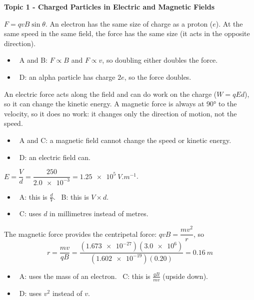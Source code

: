 \documentclass[12pt]{article}
\newcommand\anstopic[1]{\par\Needspace{8\baselineskip}\vspace{4mm}%
  \begin{center}{\headfont\bfseries\fontsize{14}{18}\selectfont #1\par}\end{center}\vspace{2pt}}
\begin{document}
\begin{practiceanswers}

\anstopic{Topic 1 - Charged Particles in Electric and Magnetic Fields}

\begin{practiceans}
  $F = qvB\sin\theta$. An electron has the same size of charge as a proton ($e$). At the same speed in
  the same field, the force has the same size (it acts in the opposite direction).
  \begin{itemize}
    \item \xmark\ A and B: $F \propto B$ and $F \propto v$, so doubling either doubles the force.
    \item \xmark\ D: an alpha particle has charge $2e$, so the force doubles.
  \end{itemize}
\end{practiceans}

\begin{practiceans}
  An electric force acts along the field and can do work on the charge ($W = qEd$), so it can change
  the kinetic energy. A magnetic force is always at \ang{90} to the velocity, so it does no work: it
  changes only the direction of motion, not the speed.
  \begin{itemize}
    \item \xmark\ A and C: a magnetic field cannot change the speed or kinetic energy.
    \item \xmark\ D: an electric field can.
  \end{itemize}
\end{practiceans}

\begin{practiceans}
  $E = \dfrac{V}{d} = \dfrac{250}{\num{2.0e-3}} = \qty{1.25e5}{V.m^{-1}}$.
  \begin{itemize}
    \item \xmark\ A: this is $\frac{d}{V}$. \quad \xmark\ B: this is $V \times d$.
    \item \xmark\ C: uses $d$ in millimetres instead of metres.
  \end{itemize}
\end{practiceans}

\begin{practiceans}
  The magnetic force provides the centripetal force: $qvB = \dfrac{mv^2}{r}$, so
  \[ r = \frac{mv}{qB} = \frac{(\num{1.673e-27})(\num{3.0e6})}{(\num{1.602e-19})(0.20)} = \qty{0.16}{m} \]
  \begin{itemize}
    \item \xmark\ A: uses the mass of an electron. \quad \xmark\ C: this is $\frac{qB}{mv}$ (upside down).
    \item \xmark\ D: uses $v^2$ instead of $v$.
  \end{itemize}
\end{practiceans}


\end{practiceanswers}
\end{document}
